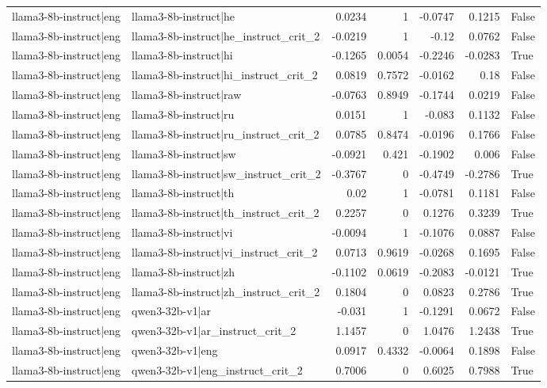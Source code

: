\begin{table}
\begin{tabular}{l l r r r r l}
llama3-8b-instruct|eng & llama3-8b-instruct|he & 0.0234 & 1 & -0.0747 & 0.1215 & False \\
llama3-8b-instruct|eng & llama3-8b-instruct|he_instruct_crit_2 & -0.0219 & 1 & -0.12 & 0.0762 & False \\
llama3-8b-instruct|eng & llama3-8b-instruct|hi & -0.1265 & 0.0054 & -0.2246 & -0.0283 & True \\
llama3-8b-instruct|eng & llama3-8b-instruct|hi_instruct_crit_2 & 0.0819 & 0.7572 & -0.0162 & 0.18 & False \\
llama3-8b-instruct|eng & llama3-8b-instruct|raw & -0.0763 & 0.8949 & -0.1744 & 0.0219 & False \\
llama3-8b-instruct|eng & llama3-8b-instruct|ru & 0.0151 & 1 & -0.083 & 0.1132 & False \\
llama3-8b-instruct|eng & llama3-8b-instruct|ru_instruct_crit_2 & 0.0785 & 0.8474 & -0.0196 & 0.1766 & False \\
llama3-8b-instruct|eng & llama3-8b-instruct|sw & -0.0921 & 0.421 & -0.1902 & 0.006 & False \\
llama3-8b-instruct|eng & llama3-8b-instruct|sw_instruct_crit_2 & -0.3767 & 0 & -0.4749 & -0.2786 & True \\
llama3-8b-instruct|eng & llama3-8b-instruct|th & 0.02 & 1 & -0.0781 & 0.1181 & False \\
llama3-8b-instruct|eng & llama3-8b-instruct|th_instruct_crit_2 & 0.2257 & 0 & 0.1276 & 0.3239 & True \\
llama3-8b-instruct|eng & llama3-8b-instruct|vi & -0.0094 & 1 & -0.1076 & 0.0887 & False \\
llama3-8b-instruct|eng & llama3-8b-instruct|vi_instruct_crit_2 & 0.0713 & 0.9619 & -0.0268 & 0.1695 & False \\
llama3-8b-instruct|eng & llama3-8b-instruct|zh & -0.1102 & 0.0619 & -0.2083 & -0.0121 & True \\
llama3-8b-instruct|eng & llama3-8b-instruct|zh_instruct_crit_2 & 0.1804 & 0 & 0.0823 & 0.2786 & True \\
llama3-8b-instruct|eng & qwen3-32b-v1|ar & -0.031 & 1 & -0.1291 & 0.0672 & False \\
llama3-8b-instruct|eng & qwen3-32b-v1|ar_instruct_crit_2 & 1.1457 & 0 & 1.0476 & 1.2438 & True \\
llama3-8b-instruct|eng & qwen3-32b-v1|eng & 0.0917 & 0.4332 & -0.0064 & 0.1898 & False \\
llama3-8b-instruct|eng & qwen3-32b-v1|eng_instruct_crit_2 & 0.7006 & 0 & 0.6025 & 0.7988 & True \\

\end{tabular}
\end{table}
